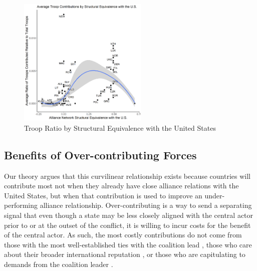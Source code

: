 \documentclass[12pt,letterpaper]{article}
\begin{document}
		\begin{figure}[H]
			\centering
			\includegraphics[width=0.55\textwidth]{figures/contributions.png}
			\caption{Troop Ratio by Structural Equivalence with the United States}
			\label{fig:contr_sequiv}
		\end{figure}
		
	\subsection{Benefits of Over-contributing Forces}
		Our theory argues that this curvilinear relationship exists because countries will contribute most not when they already have close alliance relations with the United States, but when that contribution is used to improve an under-performing alliance relationship. Over-contributing is a way to send a separating signal that even though a state may be less closely aligned with the central actor prior to or at the outset of the conflict, it is willing to incur costs for the benefit of the central actor. As such, the most costly contributions do not come from those with the most well-established ties with the coalition lead \citep{ringsmose_natoburdensharingredux_2010}, those who care about their broader international reputation \citep{pedersen_bandwagonstatuschanging_2018}, or those who are capitulating to demands from the coalition leader \citep{schweller_newrealistresearch_1997}.
\end{document}
